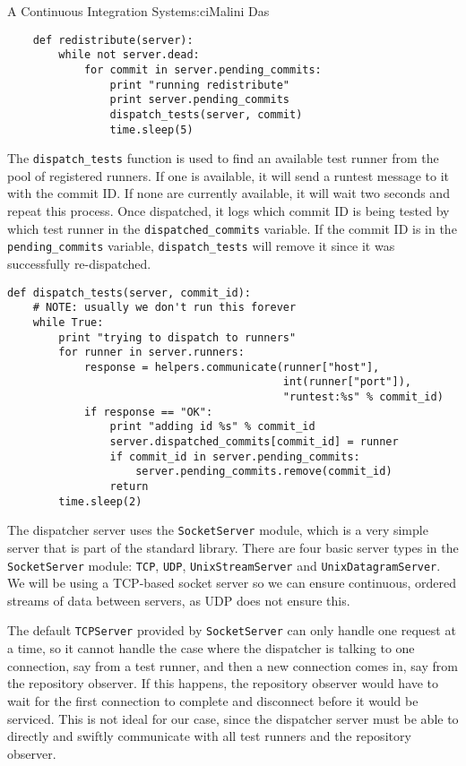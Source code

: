 \begin{aosachapter}{A Continuous Integration System}{s:ci}{Malini Das}
\begin{verbatim}
    def redistribute(server):
        while not server.dead:
            for commit in server.pending_commits:
                print "running redistribute"
                print server.pending_commits
                dispatch_tests(server, commit)
                time.sleep(5)
\end{verbatim}

The \texttt{dispatch\_tests} function is used to find an available test
runner from the pool of registered runners. If one is available, it will
send a runtest message to it with the commit ID. If none are currently
available, it will wait two seconds and repeat this process. Once
dispatched, it logs which commit ID is being tested by which test runner
in the \texttt{dispatched\_commits} variable. If the commit ID is in the
\texttt{pending\_commits} variable, \texttt{dispatch\_tests} will remove
it since it was successfully re-dispatched.

\begin{verbatim}
def dispatch_tests(server, commit_id):
    # NOTE: usually we don't run this forever
    while True:
        print "trying to dispatch to runners"
        for runner in server.runners:
            response = helpers.communicate(runner["host"],
                                           int(runner["port"]),
                                           "runtest:%s" % commit_id)
            if response == "OK":
                print "adding id %s" % commit_id
                server.dispatched_commits[commit_id] = runner
                if commit_id in server.pending_commits:
                    server.pending_commits.remove(commit_id)
                return
        time.sleep(2)
\end{verbatim}

The dispatcher server uses the \texttt{SocketServer} module, which is a
very simple server that is part of the standard library. There are four
basic server types in the \texttt{SocketServer} module: \texttt{TCP},
\texttt{UDP}, \texttt{UnixStreamServer} and \texttt{UnixDatagramServer}.
We will be using a TCP-based socket server so we can ensure continuous,
ordered streams of data between servers, as UDP does not ensure this.

The default \texttt{TCPServer} provided by \texttt{SocketServer} can
only handle one request at a time, so it cannot handle the case where
the dispatcher is talking to one connection, say from a test runner, and
then a new connection comes in, say from the repository observer. If
this happens, the repository observer would have to wait for the first
connection to complete and disconnect before it would be serviced. This
is not ideal for our case, since the dispatcher server must be able to
directly and swiftly communicate with all test runners and the
repository observer.


\end{aosachapter}
